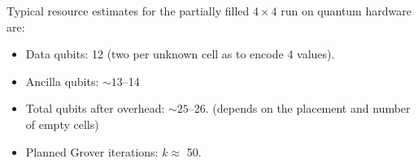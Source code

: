 \vspace{1em}
\noindent Typical resource estimates for the partially filled $4\times 4$ run on quantum hardware are:
\begin{itemize}
  \item Data qubits: 12 (two per unknown cell as to encode 4 values).
  \item Ancilla qubits: $\sim 13$--14 
  \item Total qubits after overhead: $\sim 25$--26. (depends on the placement and number of empty cells)
  \item Planned Grover iterations: $k\approx$ 50.
\end{itemize}





